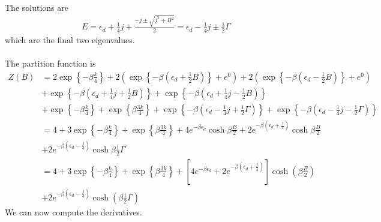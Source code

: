 \documentclass[twoside,11pt]{report}
\numberwithin{equation}{section}
\begin{document}
The solutions are
\begin{equation}\begin{aligned}
	E = \epsilon_d + \frac{1}{4}j + \frac{-j \pm \sqrt{j^2 + B^2}}{2} = \epsilon_d - \frac{1}{4}j \pm \frac{1}{2}\Gamma
\end{aligned}\end{equation}
which are the final two eigenvalues.
\\\\The partition function is
\begin{equation}\begin{aligned}
	Z(B) &= 2 \exp\left\{-\beta \frac{k}{4}\right\} + 2\left( \exp\left\{-\beta\left(\epsilon_d + \frac{1}{2} B\right)\right\} + e^0\right) + 2\left( \exp\left\{-\beta\left(\epsilon_d - \frac{1}{2} B\right)\right\} + e^0\right) \\
	     &+ \exp\left\{-\beta\left(\epsilon_d + \frac{1}{4}j + \frac{1}{2} B\right)\right\} + \exp\left\{-\beta\left(\epsilon_d + \frac{1}{4}j - \frac{1}{2} B\right)\right\} \\
	     &+ \exp\left\{-\beta \frac{k}{4}\right\} + \exp\left\{\beta \frac{3k}{4}\right\} + \exp\left\{-\beta\left(\epsilon_d - \frac{1}{4}j + \frac{1}{2}\Gamma\right)\right\} + \exp\left\{-\beta\left( \epsilon_d- \frac{1}{4}j - \frac{1}{2}\Gamma\right)\right\}\\
	     &= 4 + 3\exp\left\{-\beta \frac{k}{4}\right\} + \exp\left\{\beta \frac{3k}{4}\right\} + 4e^{-\beta \epsilon_d}\cosh \beta \frac{B}{2} + 2e^{-\beta \left(\epsilon_d + \frac{j}{4}\right)}\cosh \beta \frac{B}{2}\\
	     &+ 2e^{-\beta\left(\epsilon_d - \frac{j}{4}\right)}\cosh \beta \frac{1}{2}\Gamma\\
	     &= 4 + 3\exp\left\{-\beta \frac{k}{4}\right\} + \exp\left\{\beta \frac{3k}{4}\right\} + \left[4e^{-\beta \epsilon_d} + 2e^{-\beta \left(\epsilon_d + \frac{j}{4}\right)}\right]\cosh \left(\beta \frac{B}{2}\right) \\
	     &+ 2e^{-\beta\left(\epsilon_d - \frac{j}{4}\right)}\cosh \left(\beta \frac{1}{2}\Gamma\right)
\end{aligned}\end{equation}
We can now compute the derivatives.
\end{document}
